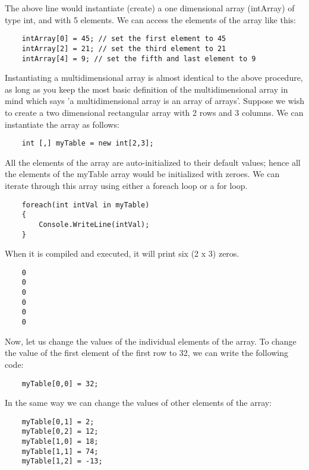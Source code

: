 The above line would instantiate (create) a one dimensional array (intArray) of type int, and with 5 elements. We
can access the elements of the array like this:\\

\begin{lstlisting}
    intArray[0] = 45; // set the first element to 45
    intArray[2] = 21; // set the third element to 21
    intArray[4] = 9; // set the fifth and last element to 9        
\end{lstlisting}

Instantiating a multidimensional array is almost identical to the above procedure, as long as you keep the most
basic definition of the multidimensional array in mind which says ’a multidimensional array is an array of arrays’.
Suppose we wish to create a two dimensional rectangular array with 2 rows and 3 columns. We can instantiate the
array as follows:

\begin{lstlisting}
    int [,] myTable = new int[2,3];    
\end{lstlisting}

All the elements of the array are auto-initialized to their default values; hence all the elements of the myTable array
would be initialized with zeroes. We can iterate through this array using either a foreach loop or a for loop.

\begin{lstlisting}
    foreach(int intVal in myTable)
    {
        Console.WriteLine(intVal);
    }        
\end{lstlisting}

When it is compiled and executed, it will print six (2 x 3) zeros.

\begin{lstlisting}
    0
    0
    0
    0
    0
    0        
\end{lstlisting}

Now, let us change the values of the individual elements of the array. To change the value of the first element of
the first row to 32, we can write the following code:

\begin{lstlisting}
    myTable[0,0] = 32;    
\end{lstlisting}

In the same way we can change the values of other elements of the array:

\begin{lstlisting}
    myTable[0,1] = 2;
    myTable[0,2] = 12;
    myTable[1,0] = 18;
    myTable[1,1] = 74;
    myTable[1,2] = -13;        
\end{lstlisting}

